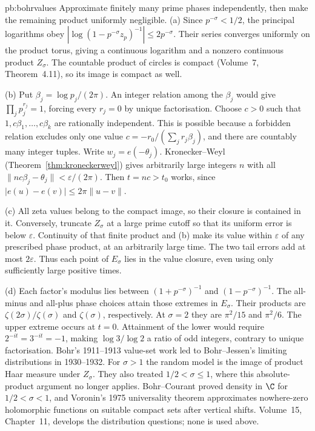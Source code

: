 \begin{solution}{pb:bohrvalues}
\idea Approximate finitely many prime phases independently, then make the remaining product uniformly negligible.
\writeup (a) Since $p^{-\sigma}<1/2$, the principal logarithms obey $|\log(1-p^{-\sigma}z_p)^{-1}|\le2p^{-\sigma}$. Their series converges uniformly on the product torus, giving a continuous logarithm and a nonzero continuous product $Z_\sigma$. The countable product of circles is compact (Volume~7, Theorem~4.11), so its image is compact as well.

(b) Put $\beta_j=\log p_j/(2\pi)$. An integer relation among the $\beta_j$ would give $\prod_jp_j^{r_j}=1$, forcing every $r_j=0$ by unique factorisation. Choose $c>0$ such that $1,c\beta_1,\ldots,c\beta_k$ are rationally independent. This is possible because a forbidden relation excludes only one value $c=-r_0/(\sum_jr_j\beta_j)$, and there are countably many integer tuples. Write $w_j=e(-\theta_j)$. Kronecker--Weyl (Theorem~\ref{thm:kroneckerweyl}) gives arbitrarily large integers $n$ with all $\|nc\beta_j-\theta_j\|<\varepsilon/(2\pi)$. Then $t=nc>t_0$ works, since $|e(u)-e(v)|\le2\pi\|u-v\|$.

(c) All zeta values belong to the compact image, so their closure is contained in it. Conversely, truncate $Z_\sigma$ at a large prime cutoff so that its uniform error is below $\varepsilon$. Continuity of that finite product and (b) make its value within $\varepsilon$ of any prescribed phase product, at an arbitrarily large time. The two tail errors add at most $2\varepsilon$. Thus each point of $E_\sigma$ lies in the value closure, even using only sufficiently large positive times.

(d) Each factor's modulus lies between $(1+p^{-\sigma})^{-1}$ and $(1-p^{-\sigma})^{-1}$. The all-minus and all-plus phase choices attain those extremes in $E_\sigma$. Their products are $\zeta(2\sigma)/\zeta(\sigma)$ and $\zeta(\sigma)$, respectively. At $\sigma=2$ they are $\pi^2/15$ and $\pi^2/6$. The upper extreme occurs at $t=0$. Attainment of the lower would require $2^{-it}=3^{-it}=-1$, making $\log3/\log2$ a ratio of odd integers, contrary to unique factorisation.
\leads Bohr's 1911--1913 value-set work led to Bohr--Jessen's limiting distributions in 1930--1932. For $\sigma>1$ the random model is the image of product Haar measure under $Z_\sigma$. They also treated $1/2<\sigma\le1$, where this absolute-product argument no longer applies. Bohr--Courant proved density in $\C$ for $1/2<\sigma<1$, and Voronin's 1975 universality theorem approximates nowhere-zero holomorphic functions on suitable compact sets after vertical shifts. Volume~15, Chapter~11, develops the distribution questions; none is used above.
\end{solution}

